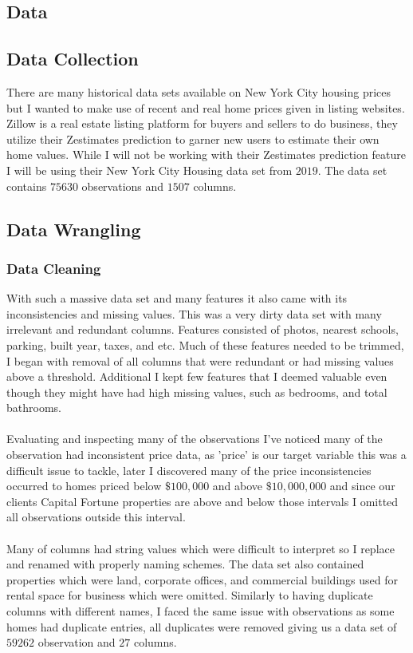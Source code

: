 \documentclass{article}
\begin{document}
\begin{titlepage}
\section{Data}
\subsection{Data Collection}
    There are many historical data sets available on New York City housing prices but I wanted to make use of recent and real home prices given in listing websites. Zillow is a real estate listing platform for buyers and sellers to do business, they utilize their Zestimates prediction to garner new users to estimate their own home values. While I will not be working with their Zestimates prediction feature I will be using their New York City Housing data set from $2019$. The data set contains $75630$ observations and $1507$ columns.
    
\subsection{Data Wrangling}
\subsubsection{Data Cleaning}
    With such a massive data set and many features it also came with its inconsistencies and missing values. This was a very dirty data set with many irrelevant and redundant columns. Features consisted of photos, nearest schools, parking, built year, taxes, and etc. Much of these features needed to be trimmed, I began with removal of all columns that were redundant or had missing values above a threshold. Additional I kept few features that I deemed valuable even though they might have had high missing values, such as bedrooms, and total bathrooms. \\
    \\
    Evaluating and inspecting many of the observations I've noticed many of the observation had inconsistent price data, as 'price' is our target variable this was a difficult issue to tackle, later I discovered many of the price inconsistencies occurred to homes priced below $\$100,000$ and above $\$10,000,000$ and since our clients Capital Fortune properties are above and below those intervals I omitted all observations outside this interval. \\
    \\
    Many of columns had string values which were difficult to interpret so I replace and renamed with properly naming schemes. The data set also contained properties which were land, corporate offices, and commercial buildings used for rental space for business which were omitted. Similarly to having duplicate columns with different names, I faced the same issue with observations as some homes had duplicate entries, all duplicates were removed giving us a data set of $59262$ observation and $27$ columns.

\end{titlepage}
\end{document}
